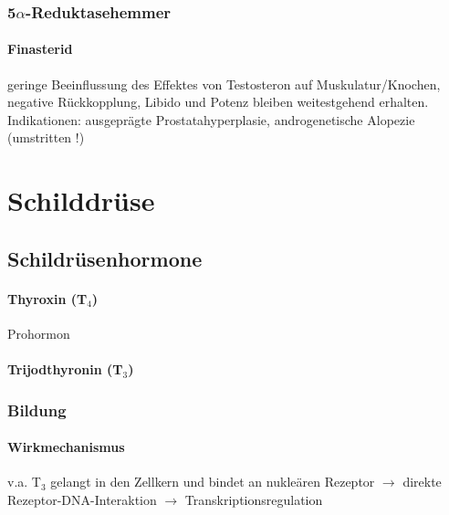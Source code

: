 \documentclass[10pt,a4paper]{report}
\begin{document}
\subsection{5$\alpha$-Reduktasehemmer} %
\label{sub:5_alpha_reduktasehemmer}
\subsubsection{Finasterid} %
\label{par:finasterid}
geringe Beeinflussung des Effektes von Testosteron auf Muskulatur/Knochen, negative Rückkopplung, Libido und Potenz bleiben weitestgehend erhalten.\\
Indikationen: ausgeprägte Prostatahyperplasie, androgenetische Alopezie (umstritten !) 
\chapter{Schilddrüse} %
\label{cha:schilddr_se}
\section{Schildrüsenhormone} %
\label{sec:schildr_senhormone}
\subsubsection{Thyroxin (T$_4$)} %
\label{par:thyroxin_t__4_}
Prohormon
\subsubsection{Trijodthyronin (T$_3$)} %
\label{par:trijodthyronin_t__3_}
\subsection{Bildung} %
\label{sub:bildung}
\subsubsection{Wirkmechanismus} %
\label{par:wirkmechanismus}
v.a. T$_3$ gelangt in den Zellkern und bindet an nukleären Rezeptor $\rightarrow$ direkte Rezeptor-DNA-Interaktion $\rightarrow$ Transkriptionsregulation
\end{document}
